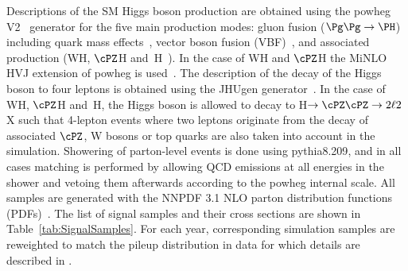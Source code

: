 Descriptions of the SM Higgs boson production are obtained using the 
{\sc powheg V2}~\cite{Alioli:2008gx,Nason:2004rx,Frixione:2007vw} generator for the five main production modes: 
gluon fusion ($\ggH$) including quark mass effects~\cite{Bagnaschi:2011tu}, vector boson fusion 
(VBF)~\cite{Nason:2009ai}, and associated production (WH, $\cPZ$H and \ttbar$\,$H~\cite{Hartanto:2015uka}). 
In the case of WH and $\cPZ$H the {\sc MiNLO HVJ} extension of {\sc powheg} is used~\cite{Luisoni:2013kna}. 
The description of the decay of the Higgs boson to four leptons is obtained using the {\sc JHUgen} 
generator~\cite{Gao:2010qx}. In the case of WH, $\cPZ$H and \ttbar$\,$H, the Higgs boson is allowed
to decay to H$\to \cPZ \cPZ \to 2\ell2$X such that 4-lepton events where two leptons originate from 
the decay of associated $\cPZ$, W bosons or top quarks are also taken into account in the simulation. 
Showering of parton-level events is done using {\sc pythia8.209}, and in all cases matching is performed by 
allowing QCD emissions at all energies in the shower and vetoing them afterwards according to the 
{\sc powheg} internal scale. All samples are generated with the NNPDF 3.1 NLO parton distribution 
functions (PDFs)~\cite{Ball:2014uwa}. The list of signal samples and their cross sections are shown in 
Table~\ref{tab:SignalSamples}. For each year, corresponding simulation samples are reweighted to match the pileup distribution in data for which details are described in \cite{CMS-PAS-HIG-19-001}.


